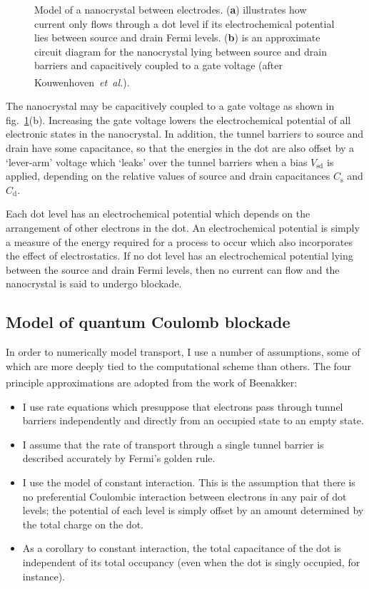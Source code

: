 \documentclass[a4paper,11pt]{article}
\let\oldcite\cite
\renewcommand{\cite}[1]{\textsuperscript{\oldcite{#1}}}
\begin{document}
\begin{figure}[h!]
\begin{center}
{
        }
        \caption{Model of a nanocrystal between electrodes. (\textbf{a}) illustrates how current only flows through a dot level if its electrochemical potential lies between source and drain Fermi levels. (\textbf{b}) is an approximate circuit diagram for the nanocrystal lying between source and drain barriers and capacitively coupled to a gate voltage (after Kouwenhoven~\textit{et~al.}\cite{Kouwenhoven-1991}).}
        \label{fig:Setup_schematics}
    \end{center}
    \end{figure}

    The nanocrystal may be capacitively coupled to a gate voltage as shown in fig.~\ref{fig:Setup_schematics}(b). Increasing the gate voltage lowers the electrochemical potential of all electronic states in the nanocrystal. In addition, the tunnel barriers to source and drain have some capacitance, so that the energies in the dot are also offset by a `lever-arm' voltage which `leaks' over the tunnel barriers when a bias $V_\mathrm{sd}$ is applied, depending on the relative values of source and drain capacitances $C_\mathrm{s}$ and $C_\mathrm{d}$.

    Each dot level has an electrochemical potential which depends on the arrangement of other electrons in the dot. An electrochemical potential is simply a measure of the energy required for a process to occur which also incorporates the effect of electrostatics. If no dot level has an electrochemical potential lying between the source and drain Fermi levels, then no current can flow and the nanocrystal is said to undergo blockade.

    \subsection{Model of quantum Coulomb blockade}
    In order to numerically model transport, I use a number of assumptions, some of which are more deeply tied to the computational scheme than others. The four principle approximations are adopted from the work of Beenakker\cite{Beenakker-1991}:
    \begin{itemize}
        \item I use rate equations which presuppose that electrons pass through tunnel barriers independently and directly from an occupied state to an empty state.
        \item I assume that the rate of transport through a single tunnel barrier is described accurately by Fermi's golden rule.
        \item I use the model of constant interaction. This is the assumption that there is no preferential Coulombic interaction between electrons in any pair of dot levels; the potential of each level is simply offset by an amount determined by the total charge on the dot.
        \item As a corollary to constant interaction, the total capacitance of the dot is independent of its total occupancy (even when the dot is singly occupied, for instance).
    \end{itemize}
\end{document}

